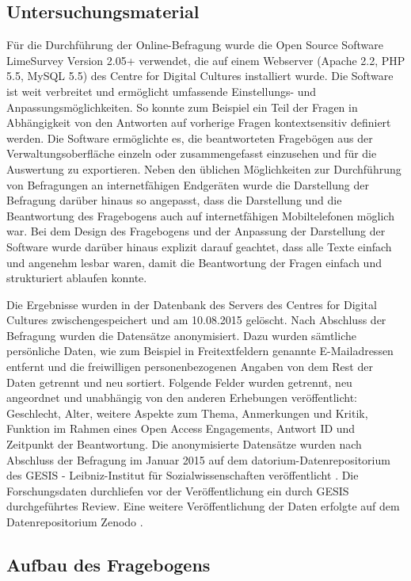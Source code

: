 \subsection{Untersuchungsmaterial}

Für die Durchführung der Online-Befragung wurde die Open Source Software LimeSurvey Version 2.05+ verwendet, die auf einem Webserver (Apache 2.2, PHP 5.5, MySQL 5.5) des Centre for Digital Cultures installiert wurde. Die Software ist weit verbreitet und ermöglicht umfassende Einstellungs- und Anpassungsmöglichkeiten. So konnte zum Beispiel ein Teil der Fragen in Abhängigkeit von den Antworten auf vorherige Fragen kontextsensitiv definiert werden. Die Software ermöglichte es, die beantworteten Fragebögen aus der Verwaltungsoberfläche einzeln oder zusammengefasst einzusehen und für die Auswertung zu exportieren. Neben den üblichen Möglichkeiten zur Durchführung von Befragungen an internetfähigen Endgeräten wurde die Darstellung der Befragung darüber hinaus so angepasst, dass die Darstellung und die Beantwortung des Fragebogens auch auf internetfähigen Mobiltelefonen möglich war. Bei dem Design des Fragebogens und der Anpassung der Darstellung der Software wurde darüber hinaus explizit darauf geachtet, dass alle Texte einfach und angenehm lesbar waren, damit die Beantwortung der Fragen einfach und strukturiert ablaufen konnte.

Die Ergebnisse wurden in der Datenbank des Servers des Centres for Digital Cultures zwischengespeichert und am 10.08.2015 gelöscht. Nach Abschluss der Befragung wurden die Datensätze anonymisiert. Dazu wurden sämtliche persönliche Daten, wie zum Beispiel in Freitextfeldern genannte E-Mailadressen entfernt und die freiwilligen personenbezogenen Angaben von dem Rest der Daten getrennt und neu sortiert. Folgende Felder wurden getrennt, neu angeordnet und unabhängig von den anderen Erhebungen veröffentlicht: Geschlecht, Alter, weitere Aspekte zum Thema, Anmerkungen und Kritik, Funktion im Rahmen eines Open Access Engagements, Antwort ID und Zeitpunkt der Beantwortung. Die anonymisierte Datensätze wurden nach Abschluss der Befragung im Januar 2015 auf dem datorium-Datenrepositorium des GESIS - Leibniz-Institut für Sozialwissenschaften veröffentlicht \cite{heise_2015_os_data_gesis}. Die Forschungsdaten durchliefen vor der Veröffentlichung ein durch GESIS durchgeführtes Review. Eine weitere Veröffentlichung der Daten erfolgte auf dem Datenrepositorium Zenodo \cite{heise_2015_os_data_zenodo}.

\subsection{Aufbau des Fragebogens}

